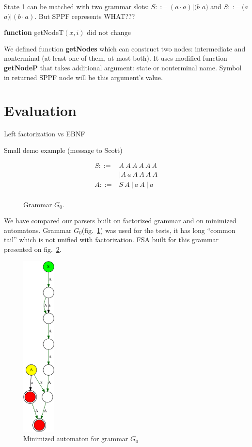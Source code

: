 \documentclass[runningheads,a4paper]{llncs}
\begin{document}
State 1 can be matched with two grammar slots: $S ::= (a \cdot a)|(b$ $a)$ and $S ::= (a$ $a)|(b \cdot a)$. 
But SPPF represents WHAT???




\textbf{function} getNodeT$(x,i)$ did not change

We defined function \textbf{getNodes} which can construct two nodes: intermediate and nonterminal (at least one of them, at most both).
It uses modified function \textbf{getNodeP} that takes additional argument: state or nonterminal name. Symbol in returned SPPF node will be this argument's value.





\section{Evaluation}

Left factorization vs EBNF

Small demo example (message to Scott)

\begin{figure}[h]
$$
\begin{array}{crcl}
S ::=& A\ A\ A\ A\ A\ A \\
     &|A\ a\ A\ A\ A\ A \\
A ::=& S\ A\ |\ a\ A\ |\ a \\
\end{array}
$$
\caption{Grammar $G_0$.}
\label{testGrammar}
\end{figure}

We have compared our parsers built on factorized grammar and on minimized automatons.
Grammar $G_0$(fig.~\ref{testGrammar}) was used for the tests,
it has long ``common tail'' which is not unified with factorization.
FSA built for this grammar presented on fig.~\ref{dfa}.

\begin{figure}
\centering
\includegraphics[width=0.15\textwidth]{pictures/minimizedDFA.pdf}
\caption{\label{dfa}Minimized automaton for grammar $G_0$}
\end{figure}
\end{document}
